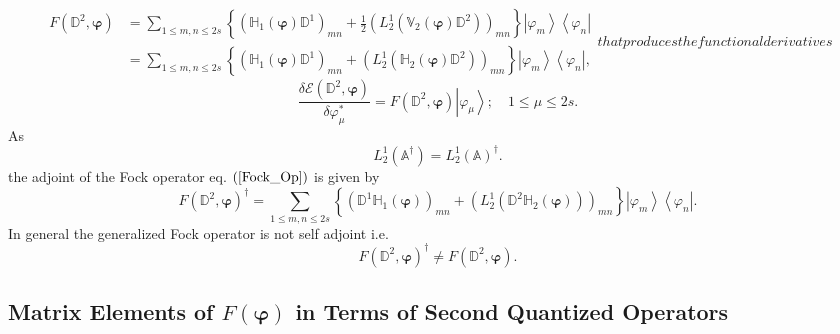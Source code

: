 \documentclass[aps,preprint]{revtex4}%
\begin{document}
\begin{subequations}
\label{Fock_Op}%
\begin{align}
F\left(  \mathbb{D}^{2},\mathbf{\varphi}\right)   &  =\sum_{1\leq m,n\leq
2s}\left\{  \left(  \mathbb{H}_{1}\left(  \mathbf{\varphi}\right)
\mathbb{D}^{1}\right)  _{mn}+\frac{1}{2}\left(  L_{2}^{1}\left(
\mathbb{V}_{2}\left(  \mathbf{\varphi}\right)  \mathbb{D}^{2}\right)  \right)
_{mn}\right\}  \left\vert \varphi_{m}\right\rangle \left\langle \varphi
_{n}\right\vert \label{Fock_Op_a}\\
&  =\sum_{1\leq m,n\leq2s}\left\{  \left(  \mathbb{H}_{1}\left(
\mathbf{\varphi}\right)  \mathbb{D}^{1}\right)  _{mn}+\left(  L_{2}^{1}\left(
\mathbb{H}_{2}\left(  \mathbf{\varphi}\right)  \mathbb{D}^{2}\right)  \right)
_{mn}\right\}  \left\vert \varphi_{m}\right\rangle \left\langle \varphi
_{n}\right\vert , \label{Fock_Op_b}%
\end{align}
that produces the functional derivatives
\end{subequations}
\begin{equation}
\frac{\delta\mathcal{E}\left(  \mathbb{D}^{2},\mathbf{\varphi}\right)
}{\delta\varphi_{\mu}^{\ast}}=F\left(  \mathbb{D}^{2},\mathbf{\varphi}\right)
\left\vert \varphi_{\mu}\right\rangle ;\quad1\leq\mu\leq2s.
\label{FuncDerFock}%
\end{equation}
As
\begin{equation}
L_{2}^{1}\left(  \mathbb{A}^{\dagger}\right)  =L_{2}^{1}\left(  \mathbb{A}%
\right)  ^{\dagger}.
\end{equation}
the adjoint of the Fock operator eq. $\left(  \ref{Fock_Op}\right)  $ is given
by
\begin{equation}
F\left(  \mathbb{D}^{2},\mathbf{\varphi}\right)  ^{\dagger}=\sum_{1\leq
m,n\leq2s}\left\{  \left(  \mathbb{D}^{1}\mathbb{H}_{1}\left(  \mathbf{\varphi
}\right)  \right)  _{mn}+\left(  L_{2}^{1}\left(  \mathbb{D}^{2}\mathbb{H}%
_{2}\left(  \mathbf{\varphi}\right)  \right)  \right)  _{mn}\right\}
\left\vert \varphi_{m}\right\rangle \left\langle \varphi_{n}\right\vert .
\label{Fock_Op_adj}%
\end{equation}
In general the generalized Fock operator is not self adjoint i.e.
\begin{equation}
F\left(  \mathbb{D}^{2},\mathbf{\varphi}\right)  ^{\dagger}\neq F\left(
\mathbb{D}^{2},\mathbf{\varphi}\right)  .
\end{equation}


\subsection{Matrix Elements of $F\left(  \mathbf{\varphi}\right)  $ in Terms
of Second Quantized Operators\label{SQ_Fock}}
\end{document}
